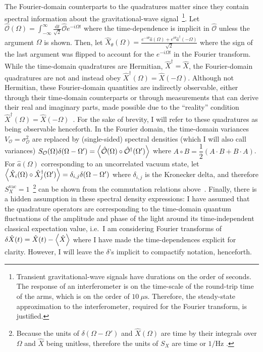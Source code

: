 The Fourier-domain counterparts to the quadratures matter since they contain spectral information about the gravitational-wave signal~\footnote{Transient gravitational-wave signals have durations on the order of seconds. The response of an interferometer is on the time-scale of the round-trip time of the arms, which is on the order of $10~\mu\text{s}$. Therefore, the steady-state approximation to the interferometer, required for the Fourier transform, is justified.}. %
Let $\hat{\mathcal{O}}(\Omega) = \int_{-\infty}^\infty \frac{\mathrm{d}t}{\sqrt{2}} \hat{\mathcal{O}} e^{-i\Omega t}$ where the time-dependence is implicit in $\hat{\mathcal{O}}$ unless the argument $\Omega$ is shown. Then, let $\hat{X}_\theta(\Omega)=\frac{e^{-i \theta}\hat{a}(\Omega)+e^{i \theta}\hat{a}^\dag(-\Omega)}{\sqrt{2}}$ where the sign of the last argument was flipped to account for the $e^{-i\Omega t}$ in the Fourier transform. While the time-domain quadratures are Hermitian, $\hat{X}^\dag=\hat{X}$, the Fourier-domain quadratures are not and instead obey $\hat{X}^\dag(\Omega)=\hat{X}(-\Omega)$. Although not Hermitian, these Fourier-domain quantities are indirectly observable, either through their time-domain counterparts or through measurements that can derive their real and imaginary parts, made possible due to the ``reality'' condition $\hat{X}^\dag(\Omega)=\hat{X}(-\Omega)$~\cite{sourcecitedinReid}. For the sake of brevity, I will refer to these quadratures as being observable henceforth. 
In the Fourier domain, the time-domain variances $V_\mathcal{O}=\sigma_\mathcal{O}^2$ are replaced by (single-sided) spectral densities (which I will also call variances) $S_\mathcal{O}(\Omega)\delta(\Omega-\Omega')=\ev{\hat{\mathcal{O}}(\Omega)\circ\hat{\mathcal{O}}^\dag(\Omega')}$ where $A\circ B=\dfrac{1}{2}(A\cdot B+B\cdot A)$. For $\hat{a}(\Omega)$ corresponding to an uncorrelated vacuum state, let $\ev{\hat{X}_i(\Omega)\circ\hat{X}_j^\dag(\Omega')}=\delta_{i,j}\delta(\Omega-\Omega')$ where $\delta_{i,j}$ is the Kronecker delta, and therefore $S_X^\text{vac}=1$~\footnote{Because the units of $\delta(\Omega-\Omega')$ and $\hat X(\Omega)$ are time by their integrals over $\Omega$ and $\hat X$ being unitless, therefore the units of $S_X$ are time or $1/\text{Hz}$ .} can be shown from the commutation relations above~\cite{Danilishin}. Finally, there is a hidden assumption in these spectral density expressions: I have assumed that the quadrature operators are corresponding to the time-domain quantum fluctuations of the amplitude and phase of the light around its time-independent classical expectation value, i.e.\ I am considering Fourier transforms of $\delta\hat{X}(t)=\hat{X}(t)-\ev{\hat{X}}$ where I have made the time-dependences explicit for clarity. However, I will leave the $\delta$'s implicit to compactify notation, henceforth.


